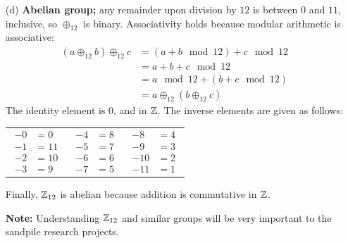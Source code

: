 \documentclass[../UNABRIDGEDalgebraNotesMSRI-UP2016.tex]{subfiles}
\begin{document}
\begin{frame}
\begin{itemize}
\item[(d)] \textbf{Abelian group;} any remainder upon division by $12$ is between $0$ and $11$, inclusive, so $\oplus_{12}$ is binary.  Associativity holds because modular arithmetic is associative:
\begin{align*}
(a\oplus_{12}b)\oplus_{12}c &= (a+b\mod{12})+c\mod{12} \\
	&= a+b+c\mod{12} \\
	&= a\mod{12}+(b+c\mod{12}) \\
	&= a\oplus_{12}(b\oplus_{12}c)
\end{align*}
The identity element is 0, and in $\mathbb Z$.  The inverse elements are given as follows:

\vspace{-1pc}
\begin{tabular}{p{}p{}p{}}
{\begin{align*}
-0 &= 0 \\
-1 &= 11 \\
-2 &= 10 \\
-3 &= 9 
\end{align*}
}
&
{\begin{align*}
-4 &= 8 \\
-5 &= 7 \\
-6 &= 6 \\
-7 &= 5 
\end{align*}
}
&
{\begin{align*}
-8 &= 4 \\
-9 &= 3 \\
-10 &= 2 \\
-11 &= 1 
\end{align*}
}
\end{tabular}

\smallGap Finally, $\mathbb Z_{12}$ is abelian because addition is commutative in $\mathbb Z$.

\smallGap
\textbf{Note:} Understanding $\mathbb Z_{12}$ and similar groups will be very important to the sandpile research projects.
\end{itemize}
\end{frame}
\end{document}
